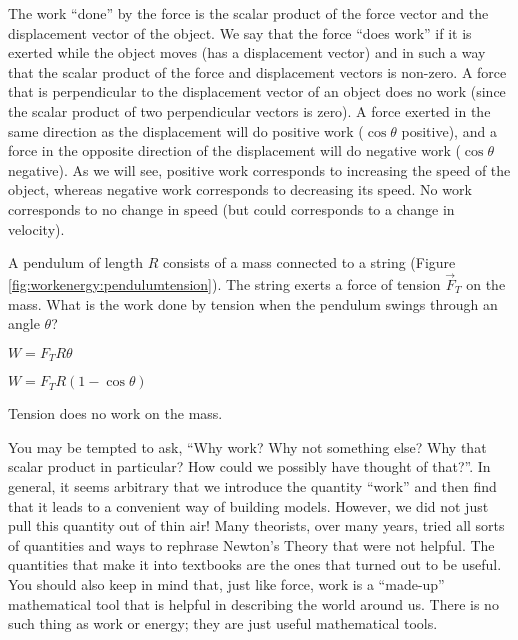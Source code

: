 The work ``done'' by the force is the scalar product of the force vector and the displacement vector of the object. We say that the force ``does work'' if it is exerted while the object moves (has a displacement vector) and in such a way that the scalar product of the force and displacement vectors is non-zero. A force that is perpendicular to the displacement vector of an object does no work (since the scalar product of two perpendicular vectors is zero).  A force exerted in the same direction as the displacement will do positive work ($\cos\theta$ positive), and a force in the opposite direction of the displacement will do negative work ($\cos\theta$ negative). As we will see, positive work corresponds to increasing the speed of the object, whereas negative work corresponds to decreasing its speed. No work corresponds to no change in speed (but could corresponds to a change in velocity).
\begin{checkpoint}
\begin{MCquestion}
{A pendulum of length $R$ consists of a mass connected to a string (Figure \ref{fig:workenergy:pendulumtension}). The string exerts a force of tension $\vec F_T$ on the mass. What is the work done by tension when the pendulum swings through an angle $\theta$?
} 
\item $W=F_TR\theta$
\item $W=F_TR(1-\cos\theta)$
\item Tension does no work on the mass. \correct
\end{MCquestion}
\end{checkpoint}

You may be tempted to ask, ``Why work? Why not something else? Why that scalar product in particular? How could we possibly have thought of that?''. In general, it seems arbitrary that we introduce the quantity ``work'' and then find that it leads to a convenient way of building models. However, we did not just pull this quantity out of thin air! Many theorists, over many years, tried all sorts of quantities and ways to rephrase Newton's Theory that were not helpful. The quantities that make it into textbooks are the ones that turned out to be useful. You should also keep in mind that, just like force, work is a ``made-up'' mathematical tool that is helpful in describing the world around us. There is no such thing as work or energy; they are just useful mathematical tools.

